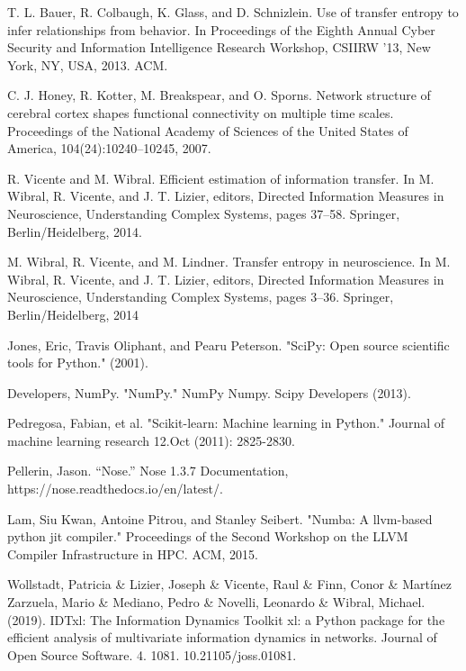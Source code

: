 \documentclass[conference]{IEEEtran}
\begin{document}
\begin{thebibliography}{00}
 T. L. Bauer, R. Colbaugh, K. Glass, and D. Schnizlein. Use of transfer entropy to infer
relationships from behavior. In Proceedings of the Eighth Annual Cyber Security and Information Intelligence Research Workshop, CSIIRW ’13, New York, NY, USA, 2013. ACM.

 C. J. Honey, R. Kotter, M. Breakspear, and O. Sporns. Network structure of cerebral cortex shapes functional connectivity on multiple time scales. Proceedings of the National Academy of Sciences of the United States of America, 104(24):10240–10245, 2007.

 R. Vicente and M. Wibral. Efficient estimation of information transfer. In M. Wibral, R. Vicente, and J. T. Lizier, editors, Directed Information Measures in Neuroscience, Understanding Complex Systems, pages 37–58. Springer, Berlin/Heidelberg, 2014.

 M. Wibral, R. Vicente, and M. Lindner. Transfer entropy in neuroscience. In M. Wibral, R. Vicente, and J. T. Lizier, editors, Directed Information Measures in Neuroscience, Understanding Complex Systems, pages 3–36. Springer, Berlin/Heidelberg, 2014

 Jones, Eric, Travis Oliphant, and Pearu Peterson. "SciPy: Open source scientific tools for Python." (2001).

 Developers, NumPy. "NumPy." NumPy Numpy. Scipy Developers (2013).

 Pedregosa, Fabian, et al. "Scikit-learn: Machine learning in Python." Journal of machine learning research 12.Oct (2011): 2825-2830.

 Pellerin, Jason. “Nose.” Nose 1.3.7 Documentation, https://nose.readthedocs.io/en/latest/.

 Lam, Siu Kwan, Antoine Pitrou, and Stanley Seibert. "Numba: A llvm-based python jit compiler." Proceedings of the Second Workshop on the LLVM Compiler Infrastructure in HPC. ACM, 2015.





 Wollstadt, Patricia \& Lizier, Joseph \& Vicente, Raul \& Finn, Conor \& Martínez Zarzuela, Mario \& Mediano, Pedro \& Novelli, Leonardo \& Wibral, Michael. (2019). IDTxl: The Information Dynamics Toolkit xl: a Python package for the efficient analysis of multivariate information dynamics in networks. Journal of Open Source Software. 4. 1081. 10.21105/joss.01081.


\end{thebibliography}
\end{document}
